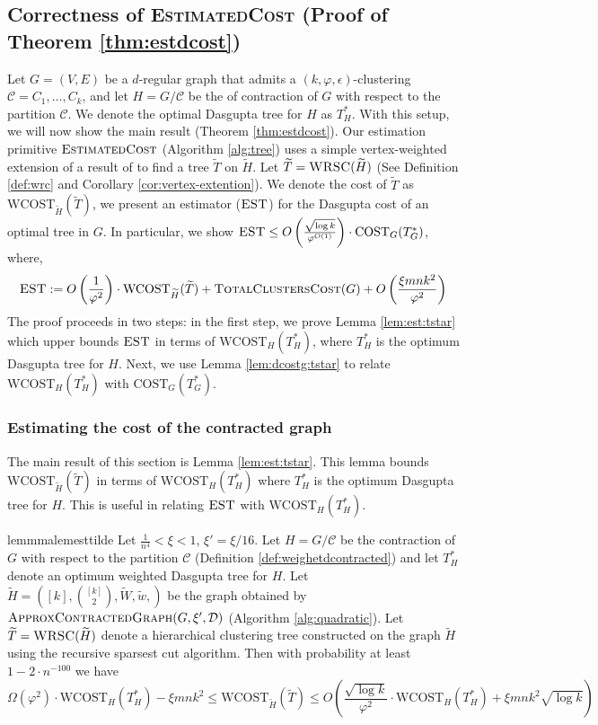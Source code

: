 \documentclass[letterpaper,11pt]{article}
\newcommand{\CT}{\text{COST}}
\newcommand{\wCT}{\text{WCOST}}
\newcommand{\est}{O\left(\frac{1}{\varphi^2}\right)\cdot  \wCT_{\wt{H}}(\wt{T}) + \textsc{TotalClustersCost}(G)+ O\left(\frac{\xi m n k^2 }{\varphi^2} \right) }
\newcommand{\eqdef}{:=}
\newcommand{\estg}{\textsc{EST}}
\newcommand{\cC}{\mathcal{C}}
\theoremstyle{plain}
\theoremstyle{definition}
\theoremstyle{remark}
\newcommand{\wt}[1]{\widetilde{#1}}
\begin{document}
\subsection{Correctness of \textsc{EstimatedCost} (Proof of Theorem \ref{thm:estdcost})} \label{sec:sketch:tree}
Let $G=(V,E)$ be a $d$-regular graph that admits a $(k,\varphi,\epsilon)$-clustering $\cC = C_1, \ldots , C_k$, and  let $H = G/\cC$ be the of contraction of $G$ with respect to the partition $\cC $. We denote the optimal Dasgupta tree for $H$ as $T^*_H$. With this setup,
we will now show the main result (Theorem \ref{thm:estdcost}). Our estimation primitive $\textsc{EstimatedCost}$ (Algorithm \ref{alg:tree}) uses a simple vertex-weighted extension of a result of \cite{charikar2017approximate}
to find a 
tree $\wt{T}$ on $\wt{H}$. 
Let $\widetilde{T}=\textsc{WRSC}(\widetilde{H})$ (See Definition \ref{def:wrc} and Corollary \ref{cor:vertex-extention}). We denote the cost of $\wt{T}$ as $\wCT_{\wt{H}}(\wt{T})$, we present an estimator ($\estg$) 
for the Dasgupta cost of an optimal tree in $G$. In particular, we show $\estg \leq O\left( \frac{\sqrt{\log k}}{\varphi^{O(1)}} \right) \cdot \CT_G(T^*_G)$, where,
$$\estg \eqdef \est $$
The proof proceeds in two steps: in the first step, we prove Lemma \ref{lem:est:tstar}
which upper bounds $\estg$ in terms of $\wCT_H(T^*_H)$, 
where $T^*_{H}$ is the optimum Dasgupta tree for $H$. 
Next, we use Lemma \ref{lem:dcostg:tstar} to relate $\wCT_H(T^*_H)$ with $\CT_G(T^*_G)$. 


\subsubsection{Estimating the cost of the contracted graph}
The main result of this section is Lemma \ref{lem:est:tstar}. This lemma bounds $\wCT_{\wt{H}}(\wt{T})$ in terms of $\wCT_H(T^*_H)$ where $T^*_H$ is the 
optimum Dasgupta tree for $H$. This is useful in relating $\estg$ with $\wCT_H(T^*_H)$. 

\begin{restatable}{lemmma}{lemesttilde} \label{lem:est:tstar}
Let $\frac{1}{n^4}<\xi<1$, $\xi'=\xi/16$. Let $H = G/\cC$ be the contraction of $G$ with respect to the partition $\cC $ (Definition \ref{def:weighetdcontracted}) and  let $T^*_H$ denote an optimum weighted Dasgupta tree for $H$.  Let $\widetilde{H}=\left([k], {[k] \choose 2}, \widetilde{W}, \widetilde{w}, \right)$ be the graph obtained by 
	$\textsc{ApproxContractedGraph}(G, \xi', \mathcal{D})$  (Algorithm \ref{alg:quadratic}). Let $\widetilde{T} = \textsc{WRSC}(\widetilde{H})$ denote a hierarchical clustering tree constructed on the graph $\widetilde{H}$ using the recursive sparsest cut algorithm. Then with probability at least $ 1-2\cdot n^{-100}$ we have
\[
\Omega\left(\varphi^2\right)\cdot \wCT_{H}(T^*_{H}) - \xi  m n k^2 \leq \wCT_{\wt{H}}(\widetilde{T}) \leq O\left( \frac{\sqrt{\log k}}{\varphi^2}\cdot \wCT_{H}(T^*_{H}) +  \xi  m n k^2 \sqrt{\log k} \right)
\]
\end{restatable}
\end{document}
